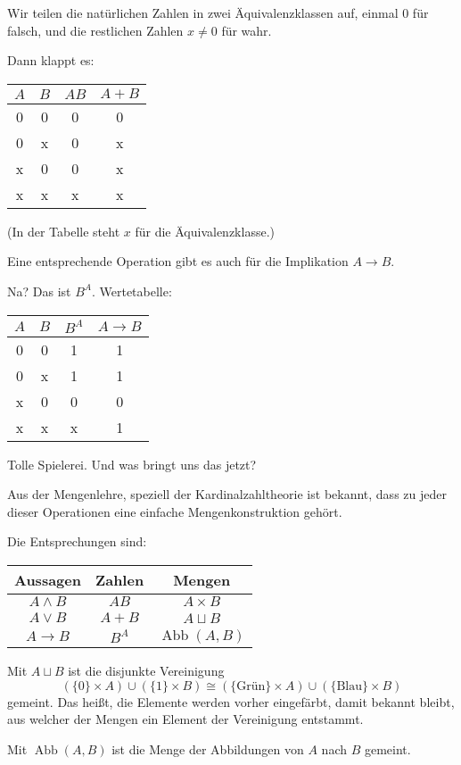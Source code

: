 \documentclass[9pt]{beamer}
\newcommand{\Abb}{\operatorname{Abb}}
\begin{document}
\begin{frame}
Wir teilen die natürlichen Zahlen in zwei Äquivalenzklassen auf,
einmal $0$ für falsch, und die restlichen Zahlen $x\ne 0$
für wahr.\pause

\vspace{1em}
Dann klappt es:
\begin{table}
\begin{tabular}{cccc}
$A$ & $B$ & $AB$ & $A+B$\\
\midrule
0 & 0 & 0 & 0\\
0 & x & 0 & x\\
x & 0 & 0 & x\\
x & x & x & x
\end{tabular}
\end{table}
(In der Tabelle steht $x$ für die Äquivalenzklasse.)
\end{frame}

\begin{frame}
Eine entsprechende Operation gibt es auch für die
Implikation $A\to B$.\pause

\vspace{1em}
Na?\pause{} Das ist $B^A$.\pause{} Wertetabelle:
\begin{table}
\begin{tabular}{cccc}
$A$ & $B$ & $B^A$ & $A\to B$\\
\midrule
0 & 0 & 1 & 1\\
0 & x & 1 & 1\\
x & 0 & 0 & 0\\
x & x & x & 1
\end{tabular}
\end{table}\pause

Tolle Spielerei. Und was bringt uns das jetzt?
\end{frame}

\begin{frame}
Aus der Mengenlehre, speziell der Kardinalzahltheorie ist bekannt,
dass zu jeder dieser Operationen eine einfache Mengenkonstruktion
gehört.\pause

\vspace{1em}
Die Entsprechungen sind:
\begin{table}
\begin{tabular}{ccc}
Aussagen & Zahlen & Mengen\\
\midrule
$A\land B$ & $AB$  & $A\times B$ \\
$A\lor B$  & $A+B$ & $A\sqcup B$\\
$A\to B$   & $B^A$ & $\Abb(A,B)$
\end{tabular}
\end{table}\pause

Mit $A\sqcup B$ ist die disjunkte Vereinigung
\[(\{0\}\times A)\cup (\{1\}\times B) \cong 
(\{\text{Grün}\}\times A)\cup (\{\text{Blau}\}\times B)\]
gemeint. Das heißt, die Elemente werden vorher eingefärbt,
damit bekannt bleibt, aus welcher der Mengen ein Element der
Vereinigung entstammt.\pause

\vspace{1em}
Mit $\Abb(A,B)$ ist die Menge der Abbildungen von $A$ nach $B$
gemeint.
\end{frame}
\end{document}
